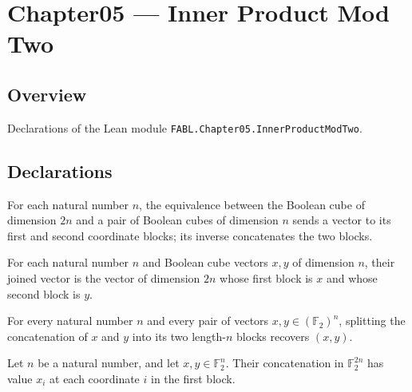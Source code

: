 \chapter{Chapter05 — Inner Product Mod Two}
\section{Overview}

Declarations of the Lean module \texttt{FABL.Chapter05.InnerProductModTwo}.

\section{Declarations}

\begin{definition}
\leanok
For each natural number $n$, the equivalence between the Boolean cube of dimension $2n$
and a pair of Boolean cubes of dimension $n$ sends a vector to its first and second
coordinate blocks; its inverse concatenates the two blocks.
\end{definition}

\begin{definition}
\leanok
{}
For each natural number $n$ and Boolean cube vectors $x,y$ of dimension $n$, their
joined vector is the vector of dimension $2n$ whose first block is $x$ and whose second
block is $y$.
\end{definition}

\begin{theorem}
\leanok
{}
For every natural number $n$ and every pair of vectors $x,y\in(\mathbb{F}_2)^n$,
splitting the concatenation of $x$ and $y$ into its two length-$n$ blocks recovers
$(x,y)$.
\end{theorem}

\begin{theorem}
\leanok
{}
Let $n$ be a natural number, and let $x,y\in\mathbb{F}_2^n$. Their concatenation in
$\mathbb{F}_2^{2n}$ has value $x_i$ at each coordinate $i$ in the first block.
\end{theorem}

